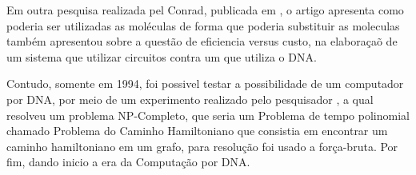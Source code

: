     Em outra pesquisa realizada pel Conrad, publicada em \citeyear{conrad_1985_on}, o artigo 
apresenta como poderia ser utilizadas as moléculas de forma que poderia substituir as moleculas
também  apresentou sobre a questão de eficiencia versus custo, na elaboraçaõ de um sistema que 
utilizar circuitos contra um que utiliza o DNA\@.

    Contudo, somente em 1994\cite{isaiafilho_2004_uma}, foi possivel testar a  possibilidade
de um computador por DNA, por meio de um experimento realizado pelo pesquisador \citeauthor{adleman_1994_molecular},
a qual resolveu um problema NP-Completo, que seria um Problema de tempo polinomial chamado
Problema do Caminho Hamiltoniano que consistia em encontrar um caminho hamiltoniano
em um grafo, para resolução foi usado a força-bruta. Por fim, dando inicio a era da
Computação por DNA\@.